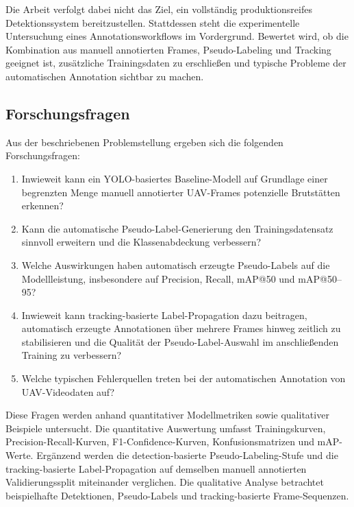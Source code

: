 Die Arbeit verfolgt dabei nicht das Ziel, ein vollständig produktionsreifes Detektionssystem bereitzustellen. Stattdessen steht die experimentelle Untersuchung eines Annotationsworkflows im Vordergrund. Bewertet wird, ob die Kombination aus manuell annotierten Frames, Pseudo-Labeling und Tracking geeignet ist, zusätzliche Trainingsdaten zu erschließen und typische Probleme der automatischen Annotation sichtbar zu machen.

\subsection{Forschungsfragen}

Aus der beschriebenen Problemstellung ergeben sich die folgenden Forschungsfragen:

\begin{enumerate}
    \item Inwieweit kann ein YOLO-basiertes Baseline-Modell auf Grundlage einer
          begrenzten Menge manuell annotierter UAV-Frames potenzielle Brutstätten
          erkennen?

    \item Kann die automatische Pseudo-Label-Generierung den Trainingsdatensatz
          sinnvoll erweitern und die Klassenabdeckung verbessern?

    \item Welche Auswirkungen haben automatisch erzeugte Pseudo-Labels auf die
          Modellleistung, insbesondere auf Precision, Recall, mAP@50 und mAP@50--95?

    \item Inwieweit kann tracking-basierte Label-Propagation dazu beitragen,
          automatisch erzeugte Annotationen über mehrere Frames hinweg zeitlich zu
          stabilisieren und die Qualität der Pseudo-Label-Auswahl im anschließenden
          Training zu verbessern?

    \item Welche typischen Fehlerquellen treten bei der automatischen Annotation
          von UAV-Videodaten auf?
\end{enumerate}

Diese Fragen werden anhand quantitativer Modellmetriken sowie qualitativer
Beispiele untersucht. Die quantitative Auswertung umfasst Trainingskurven,
Precision-Recall-Kurven, F1-Confidence-Kurven, Konfusionsmatrizen und
mAP-Werte. Ergänzend werden die detection-basierte Pseudo-Labeling-Stufe und
die tracking-basierte Label-Propagation auf demselben manuell annotierten
Validierungssplit miteinander verglichen. Die qualitative Analyse betrachtet
beispielhafte Detektionen, Pseudo-Labels und tracking-basierte Frame-Sequenzen.

